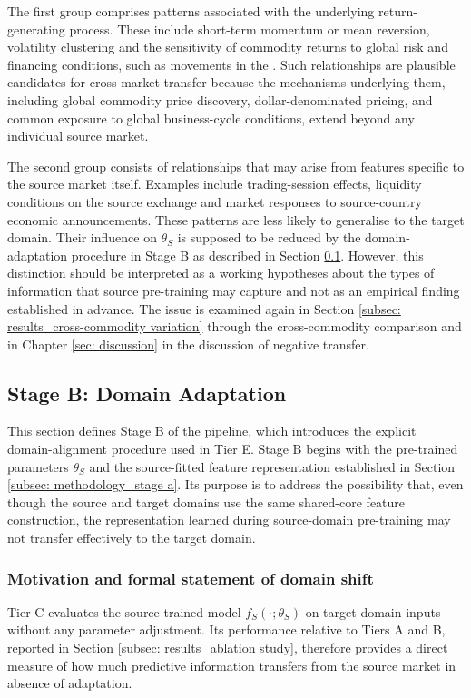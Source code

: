 The first group comprises patterns associated with the underlying return-generating process. These include short-term momentum or mean reversion, volatility clustering and the sensitivity of commodity returns to global risk and financing conditions, such as movements in the . Such relationships are plausible candidates for cross-market transfer because the mechanisms underlying them, including global commodity price discovery, dollar-denominated pricing, and common exposure to global business-cycle conditions, extend beyond any individual source market.

The second group consists of relationships that may arise from features specific to the source market itself. Examples include trading-session effects, liquidity conditions on the source exchange and market responses to source-country economic announcements. These patterns are less likely to generalise to the target domain. Their influence on $\theta_S$ is supposed to be reduced by the domain-adaptation procedure in Stage B as described in Section \ref{subsec: methodology_stage b}. However, this distinction should be interpreted as a working hypotheses about the types of information that source pre-training may capture and not as an empirical finding established in advance. The issue is examined again in Section \ref{subsec: results_cross-commodity variation} through the cross-commodity comparison and in Chapter \ref{sec: discussion} in the discussion of negative transfer. 



\subsection{Stage B: Domain Adaptation} \label{subsec: methodology_stage b}
This section defines Stage B of the pipeline, which introduces the explicit domain-alignment procedure used in Tier E. Stage B begins with the pre-trained parameters $\theta_S$ and the source-fitted feature representation established in Section \ref{subsec: methodology_stage a}. Its purpose is to address the possibility that, even though the source and target domains use the same shared-core feature construction, the representation learned during source-domain pre-training may not transfer effectively to the target domain.


\subsubsection{Motivation and formal statement of domain shift}
Tier C evaluates the source-trained model $f_S(\cdot;\theta_S)$ on target-domain inputs without any parameter adjustment. Its performance relative to Tiers A and B, reported in Section \ref{subsec: results_ablation study}, therefore provides a direct measure of how much predictive information transfers from the source market in absence of adaptation.

